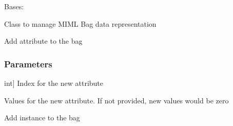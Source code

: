 \documentclass[letterpaper,10pt,english]{sphinxmanual}
\begin{document}
\begin{fulllineitems}
\label{\detokenize{data/_autosummary/miml.data.bag.Bag:miml.data.bag.Bag}}
\pysigstartsignatures
{}
\pysigstopsignatures
\sphinxAtStartPar
Bases: 

\sphinxAtStartPar
Class to manage MIML Bag data representation

\begin{fulllineitems}
\label{\detokenize{data/_autosummary/miml.data.bag.Bag:miml.data.bag.Bag.add_attribute}}
\pysigstartsignatures
{}
\pysigstopsignatures
\sphinxAtStartPar
Add attribute to the bag


\subsubsection{Parameters}
\label{\detokenize{data/_autosummary/miml.data.bag.Bag:parameters}}\begin{description}
\sphinxlineitem{position}{[}int{]}
\sphinxAtStartPar
Index for the new attribute

\sphinxAtStartPar
Values for the new attribute. If not provided, new values would be zero

\end{description}

\end{fulllineitems}


\begin{fulllineitems}
\label{\detokenize{data/_autosummary/miml.data.bag.Bag:miml.data.bag.Bag.add_instance}}
\pysigstartsignatures
{}
\pysigstopsignatures
\sphinxAtStartPar
Add instance to the bag



\end{fulllineitems}
\end{fulllineitems}
\end{document}
